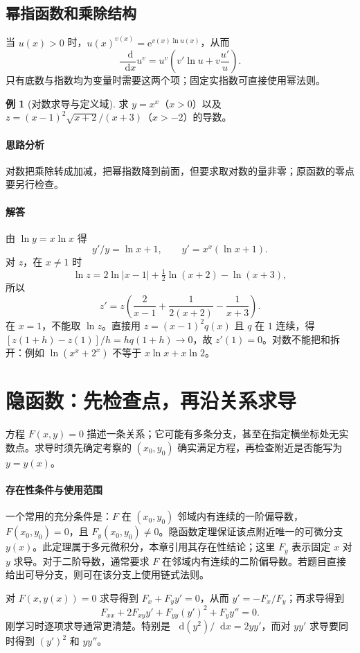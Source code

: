 \documentclass[UTF8,fontset=fandol,12pt,oneside,openany]{ctexrep}
\newcommand{\dd}{\mathop{}\!\mathrm d}
\newcommand{\ee}{\mathrm e}
\theoremstyle{definition}
\newtheorem{example}{例}[chapter]
\begin{document}
\subsection{幂指函数和乘除结构}
当 $u(x)>0$ 时，$u(x)^{v(x)}=\ee^{v(x)\ln u(x)}$，从而
\[
 \frac{\dd}{\dd x}u^v=u^v\left(v'\ln u+v\frac{u'}u\right).
\]
只有底数与指数均为变量时需要这两个项；固定实指数可直接使用幂法则。

\begin{example}[对数求导与定义域]
求 $y=x^x$（$x>0$）以及 $z=(x-1)^2\sqrt{x+2}/(x+3)$（$x>-2$）的导数。
\end{example}
\paragraph{思路分析}对数把乘除转成加减，把幂指数降到前面，但要求取对数的量非零；原函数的零点要另行检查。
\paragraph{解答}由 $\ln y=x\ln x$ 得
\[
 y'/y=\ln x+1,\qquad y'=x^x(\ln x+1).
\]
对 $z$，在 $x\ne1$ 时
\[
 \ln z=2\ln|x-1|+\tfrac12\ln(x+2)-\ln(x+3),
\]
所以
\[
 z'=z\left(\frac2{x-1}+\frac1{2(x+2)}-\frac1{x+3}\right).
\]
在 $x=1$，不能取 $\ln z$。直接用 $z=(x-1)^2 q(x)$ 且 $q$ 在 $1$ 连续，得
$[z(1+h)-z(1)]/h=hq(1+h)\to0$，故 $z'(1)=0$。对数不能把和拆开：例如 $\ln(x^x+2^x)$ 不等于 $x\ln x+x\ln2$。

\section{隐函数：先检查点，再沿关系求导}
\label{lec:05:implicit}

方程 $F(x,y)=0$ 描述一条关系；它可能有多条分支，甚至在指定横坐标处无实数点。求导时须先确定考察的 $(x_0,y_0)$ 确实满足方程，再检查附近是否能写为 $y=y(x)$。

\paragraph{存在性条件与使用范围}
一个常用的充分条件是：$F$ 在 $(x_0,y_0)$ 邻域内有连续的一阶偏导数，$F(x_0,y_0)=0$，且 $F_y(x_0,y_0)\ne0$。隐函数定理保证该点附近唯一的可微分支 $y(x)$。此定理属于多元微积分，本章引用其存在性结论；这里 $F_y$ 表示固定 $x$ 对 $y$ 求导。对于二阶导数，通常要求 $F$ 在邻域内有连续的二阶偏导数。若题目直接给出可导分支，则可在该分支上使用链式法则。

对 $F(x,y(x))=0$ 求导得到 $F_x+F_y y'=0$，从而 $y'=-F_x/F_y$；再求导得到
\[
 F_{xx}+2F_{xy}y'+F_{yy}(y')^2+F_y y''=0.
\]
刚学习时逐项求导通常更清楚。特别是 $\dd(y^2)/\dd x=2yy'$，而对 $yy'$ 求导要同时得到 $(y')^2$ 和 $yy''$。
\end{document}

